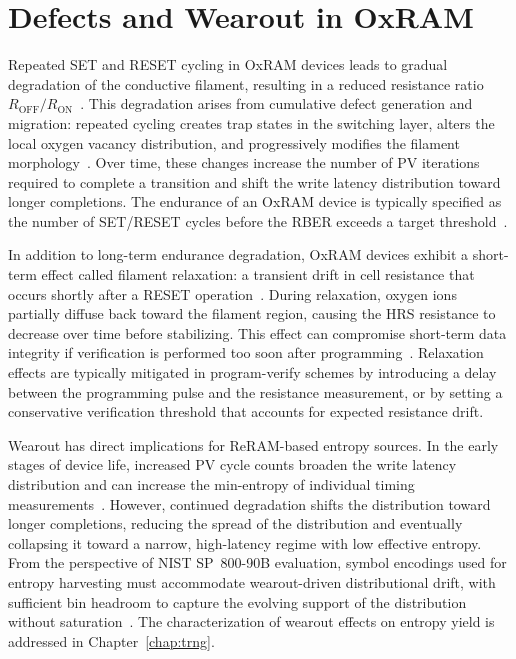 \section{Defects and Wearout in OxRAM}
\label{sec:bg-defects}

Repeated SET and RESET cycling in OxRAM devices leads to gradual
degradation of the conductive filament, resulting in a reduced
resistance ratio $R_\text{OFF}/R_\text{ON}$~\cite{chen2011physical,
	hayakawa2017resolving}. This degradation arises from cumulative defect
generation and migration: repeated cycling creates trap states in the
switching layer, alters the local oxygen vacancy distribution, and
progressively modifies the filament morphology~\cite{chen2011physical,
	wang2015reramwearout, zhang2016mellowwrite}. Over time, these changes
increase the number of PV iterations required to complete a transition
and shift the write latency distribution toward longer completions. The
endurance of an OxRAM device is typically specified as the number of
SET/RESET cycles before the RBER exceeds a target
threshold~\cite{hayakawa2017resolving, fukuyama2019comprehensive}.

In addition to long-term endurance degradation, OxRAM devices exhibit a
short-term effect called filament relaxation: a transient drift in cell
resistance that occurs shortly after a RESET
operation~\cite{li2016short}. During relaxation, oxygen ions partially
diffuse back toward the filament region, causing the HRS resistance to
decrease over time before stabilizing. This effect can compromise
short-term data integrity if verification is performed too soon after
programming~\cite{li2016short}. Relaxation effects are typically
mitigated in program-verify schemes by introducing a delay between the
programming pulse and the resistance measurement, or by setting a
conservative verification threshold that accounts for expected
resistance drift.

Wearout has direct implications for ReRAM-based entropy sources. In the
early stages of device life, increased PV cycle counts broaden the write
latency distribution and can increase the min-entropy of individual
timing measurements~\cite{fukuyama2019comprehensive}. However, continued
degradation shifts the distribution toward longer completions, reducing
the spread of the distribution and eventually collapsing it toward a
narrow, high-latency regime with low effective entropy. From the
perspective of NIST SP~800-90B evaluation, symbol encodings used for
entropy harvesting must accommodate wearout-driven distributional drift,
with sufficient bin headroom to capture the evolving support of the
distribution without saturation~\cite{sonmez2016recommendation}. The
characterization of wearout effects on entropy yield is addressed in
Chapter~\ref{chap:trng}.